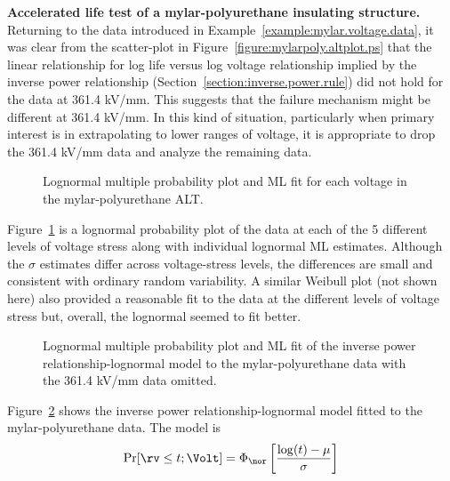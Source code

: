 \begin{example}{\bf Accelerated life test of a mylar-polyurethane insulating 
structure.} 
\label{example:mylar.voltage.ivp model}
Returning to the data introduced in
Example~\ref{example:mylar.voltage.data}, it was clear from the
scatter-plot in Figure~\ref{figure:mylarpoly.altplot.ps} that the
linear relationship for log life versus log voltage relationship
implied by the inverse power relationship
(Section~\ref{section:inverse.power.rule}) did not hold for the data
at 361.4 kV/mm.  This suggests that the failure mechanism might be
different at 361.4 kV/mm.  In this kind of situation, particularly
when primary interest is in extrapolating to lower ranges of
voltage, it is appropriate to drop the 361.4 kV/mm data and analyze
the remaining data.

\begin{figure}
\caption{Lognormal multiple 
probability plot and ML fit for each voltage in the 
mylar-polyurethane ALT.}
\label{figure:mylarpoly.lnor.groupi.ps}
\end{figure}
Figure~\ref{figure:mylarpoly.lnor.groupi.ps} is a lognormal
probability plot of the data at each of the 5 different
levels of voltage stress along with individual lognormal ML estimates.
Although the $\sigma$ estimates differ across voltage-stress levels, the 
differences are small and consistent with ordinary
random variability. A similar Weibull plot (not shown
here) also provided a reasonable fit to the data at the different
levels of voltage stress but, overall, the lognormal seemed to fit
better.
\begin{figure}
\caption{Lognormal multiple probability plot 
and ML fit of the inverse power relationship-lognormal model to
the mylar-polyurethane data with the 361.4 kV/mm data omitted.}
\label{figure:mylarsub.lnor.groupm.ps}
\end{figure}
Figure~\ref{figure:mylarsub.lnor.groupm.ps} shows the
inverse power relationship-lognormal model fitted to the mylar-polyurethane
data. The model is
\begin{displaymath}
\Pr[\rv\leq t;\Volt] = \Phi_{\nor}\left[\frac{\log(t)-\mu}{\sigma} \right]

\end{displaymath}
\end{example}
